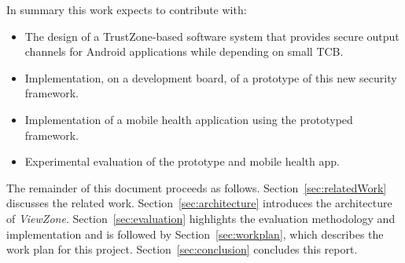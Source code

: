 In summary this work expects to contribute with:
\begin{itemize}
	\item The design of a TrustZone-based software system that provides secure output channels for Android applications while depending on small TCB.	
	\item Implementation, on a development board, of a prototype of this new security framework.
	\item Implementation of a mobile health application using the prototyped framework.
	\item Experimental evaluation of the prototype and mobile health app.
\end{itemize}

%
The remainder of this document proceeds as follows. Section~\ref{sec:relatedWork} discusses the related work. Section~\ref{sec:architecture} introduces the architecture of \emph{ViewZone}. Section~\ref{sec:evaluation} highlights the evaluation methodology and implementation and is followed by Section~\ref{sec:workplan}, which describes the work plan for this project. Section~\ref{sec:conclusion} concludes this report.
